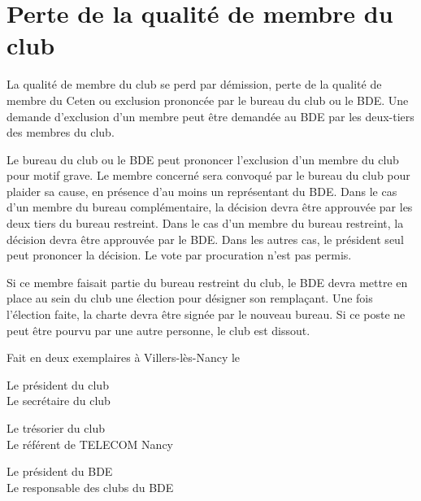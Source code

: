 \documentclass{article}
\begin{document}
\begin{multicols}{2}
{		}
		
		\section{Perte de la qualité de membre du club}
\label{sec:perte_de_la_qualite_de_membre_du_club}

		{\small

			La qualité de membre du club se perd par démission, perte de la
			qualité de membre du Ceten ou exclusion prononcée par le bureau du
			club ou le BDE\@. Une demande d’exclusion d’un membre peut être
			demandée au BDE par les deux-tiers des membres du club.

			Le bureau du club ou le BDE peut prononcer l’exclusion d’un membre
			du club pour motif grave. Le membre concerné sera convoqué par le
			bureau du club pour plaider sa cause, en présence d'au moins un
			représentant du BDE\@. Dans le cas d'un membre du bureau
			complémentaire, la décision devra être approuvée par les deux
			tiers du bureau restreint. Dans le cas d'un membre du bureau
			restreint, la décision devra être approuvée par le BDE\@. Dans les
			autres cas, le président seul peut prononcer la décision. Le vote
			par procuration n’est pas permis.

			Si ce membre faisait partie du bureau restreint du club, le BDE
			devra mettre en place au sein du club une élection pour désigner son
			remplaçant. Une fois l’élection faite, la charte devra être signée
			par le nouveau bureau. Si ce poste ne peut être pourvu par une autre
			personne, le club est dissout.

		}
		
	\end{multicols}

	\vfill
	Fait en deux exemplaires à Villers-lès-Nancy le \underline{\hspace{5cm}}
	\vfill

	\begin{multicols}{2}
		Le président du club \\
		Le secrétaire du club 
	\end{multicols}
		\vspace*{4cm}
	\begin{multicols}{2}
		Le trésorier du club \\
		Le référent de TELECOM Nancy 
	\end{multicols}
		\vspace*{4cm}
	\begin{multicols}{2}
		Le président du BDE \\
		Le responsable des clubs du BDE 
	\end{multicols}
		\vspace*{4cm}
\end{document}
